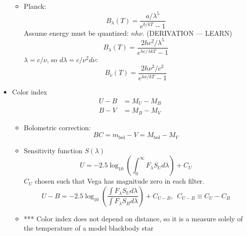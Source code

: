 \documentclass[12pt]{article}
\begin{document}
\begin{itemize}
\begin{itemize}
\item Planck:
\begin{equation}
B_\lambda(T) = \frac{a/\lambda^5}{e^{b/kT} - 1}
\end{equation}
Assume energy must be quantized: $nh\nu$. (DERIVATION --- LEARN)
\begin{equation}
B_\lambda(T) = \frac{2hc^2/\lambda^5}{e^{hc/\lambda k T} - 1}
\end{equation}
$\lambda = c/\nu$, so $d\lambda = c/\nu^2 d\nu$:
\begin{equation}
B_\nu(T) = \frac{2 h \nu^3/c^2}{e^{h\nu/k T} - 1}
\end{equation}
\end{itemize}
\item Color index
\begin{align*}
U - B &= M_U - M_B \\
B - V &= M_B - M_V
\end{align*}
\begin{itemize}
\item Bolometric correction:
\begin{equation}
BC = m_\text{bol} - V = M_\text{bol} - M_V
\end{equation}
\item Sensitivity function $S(\lambda)$
\begin{equation}
U = -2.5\log_{10}\left(\int_0^\infty F_\lambda S_U d\lambda\right)+C_U
\end{equation}
$C_U$ chosen such that Vega has magnitude zero in each filter.
\begin{equation}
U - B = -2.5\log_{10}\left(\frac{\int F_\lambda S_U d\lambda}{\int F_\lambda S_B d\lambda}\right)+C_{U-B},~~C_{U-B} \equiv C_U - C_B
\end{equation}
\item *** Color index does not depend on distance, so it is a measure solely of the temperature of a model blackbody star
\end{itemize}
\end{itemize}
\end{document}
